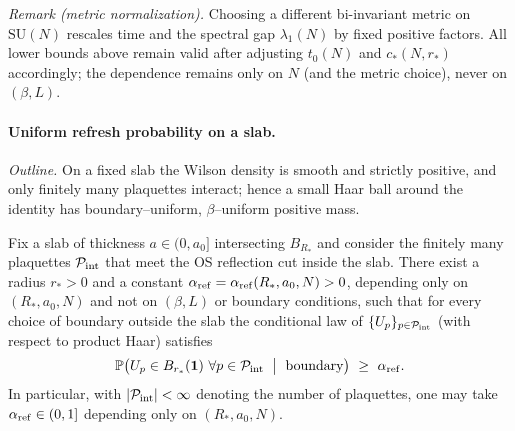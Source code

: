 \documentclass[11pt]{amsart}
\begin{document}
\noindent\emph{Remark (metric normalization).} Choosing a different bi-invariant metric on $\mathrm{SU}(N)$ rescales time and the spectral gap $\lambda_1(N)$ by fixed positive factors. All lower bounds above remain valid after adjusting $t_0(N)$ and $c_*(N,r_*)$ accordingly; the dependence remains only on $N$ (and the metric choice), never on $(\beta,L)$.

\paragraph{Uniform refresh probability on a slab.}
\emph{Outline.} On a fixed slab the Wilson density is smooth and strictly positive, and only finitely many plaquettes interact; hence a small Haar ball around the identity has boundary–uniform, $\beta$–uniform positive mass.
\begin{lemma}\label{lem:refresh-prob}
Fix a slab of thickness $a\in(0,a_0]$ intersecting $B_{R_*}$ and consider the finitely many plaquettes $\mathcal P_{\rm int}$ that meet the OS reflection cut inside the slab. There exist a radius $r_*>0$ and a constant $\alpha_{\rm ref}=\alpha_{\rm ref}(R_*,a_0,N)>0$, depending only on $(R_*,a_0,N)$ and not on $(\beta,L)$ or boundary conditions, such that for every choice of boundary outside the slab the conditional law of $\{U_p\}_{p\in\mathcal P_{\rm int}}$ (with respect to product Haar) satisfies
\[
  \mathbb P\big( U_p\in B_{r_*}(\mathbf 1)\ \forall p\in\mathcal P_{\rm int}\ \bigm|\ \text{boundary}\big)\ \ge\ \alpha_{\rm ref}.
\]
In particular, with $|\mathcal P_{\rm int}|<\infty$ denoting the number of plaquettes, one may take $\alpha_{\rm ref}\in(0,1]$ depending only on $(R_*,a_0,N)$.
\end{lemma}
\end{document}
